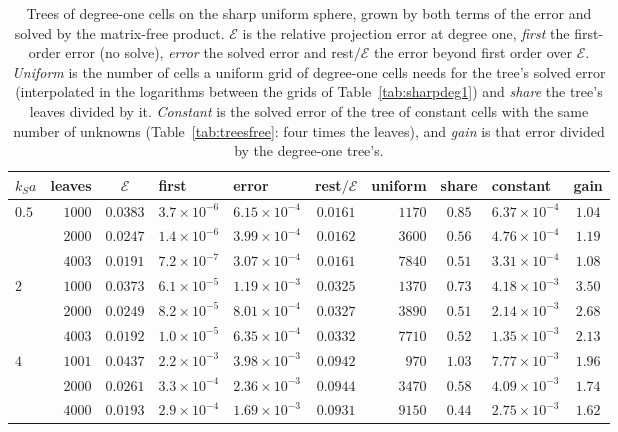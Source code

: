 \documentclass[11pt,a4paper]{article}
\newcommand{\cE}{\mathcal{E}}
\begin{document}
\begin{table}[htbp]
\centering
\caption{Trees of degree-one cells on the sharp uniform sphere, grown by both terms of the error and
solved by the matrix-free product. $\cE$ is the relative projection error at degree one, \emph{first}
the first-order error (no solve), \emph{error} the solved error and rest$/\cE$ the error beyond first
order over $\cE$. \emph{Uniform} is the number of cells a uniform grid of degree-one cells needs for
the tree's solved error (interpolated in the logarithms between the grids of
Table~\ref{tab:sharpdeg1}) and \emph{share} the tree's leaves divided by it. \emph{Constant} is the
solved error of the tree of constant cells with the same number of unknowns
(Table~\ref{tab:treesfree}: four times the leaves), and \emph{gain} is that error divided by the
degree-one tree's.}\label{tab:treesdeg1}
\small
\begin{tabular}{@{}lrcllcrclc@{}}
\toprule
$k_Sa$ & leaves & $\cE$ & first & error & rest$/\cE$ & uniform & share & constant & gain \\
\midrule
$0.5$ & $1000$ & $0.0383$ & $3.7\times10^{-6}$ & $6.15\times10^{-4}$ & $0.0161$ & $1170$ & $0.85$ & $6.37\times10^{-4}$ & $1.04$ \\
      & $2000$ & $0.0247$ & $1.4\times10^{-6}$ & $3.99\times10^{-4}$ & $0.0162$ & $3600$ & $0.56$ & $4.76\times10^{-4}$ & $1.19$ \\
      & $4003$ & $0.0191$ & $7.2\times10^{-7}$ & $3.07\times10^{-4}$ & $0.0161$ & $7840$ & $0.51$ & $3.31\times10^{-4}$ & $1.08$ \\
\midrule
$2$   & $1000$ & $0.0373$ & $6.1\times10^{-5}$ & $1.19\times10^{-3}$ & $0.0325$ & $1370$ & $0.73$ & $4.18\times10^{-3}$ & $3.50$ \\
      & $2000$ & $0.0249$ & $8.2\times10^{-5}$ & $8.01\times10^{-4}$ & $0.0327$ & $3890$ & $0.51$ & $2.14\times10^{-3}$ & $2.68$ \\
      & $4003$ & $0.0192$ & $1.0\times10^{-5}$ & $6.35\times10^{-4}$ & $0.0332$ & $7710$ & $0.52$ & $1.35\times10^{-3}$ & $2.13$ \\
\midrule
$4$   & $1001$ & $0.0437$ & $2.2\times10^{-3}$ & $3.98\times10^{-3}$ & $0.0942$ & $970$  & $1.03$ & $7.77\times10^{-3}$ & $1.96$ \\
      & $2000$ & $0.0261$ & $3.3\times10^{-4}$ & $2.36\times10^{-3}$ & $0.0944$ & $3470$ & $0.58$ & $4.09\times10^{-3}$ & $1.74$ \\
      & $4000$ & $0.0193$ & $2.9\times10^{-4}$ & $1.69\times10^{-3}$ & $0.0931$ & $9150$ & $0.44$ & $2.75\times10^{-3}$ & $1.62$ \\
\bottomrule
\end{tabular}
\end{table}
\end{document}
